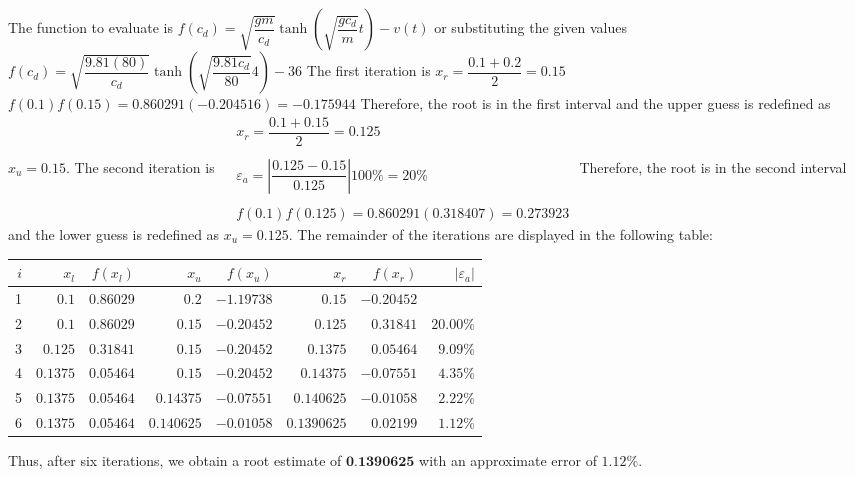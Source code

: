 \documentclass[../main.tex]{subfiles}
\begin{document}
\chapter{}
\label{cha:cha_5}


\section{}
The function to evaluate is
\bigbreak
$f\left(c_{d}\right)=\sqrt{\dfrac{g m}{c_{d}}} \tanh \left(\sqrt{\dfrac{g c_{d}}{m}} t\right)-v(t)$
\bigbreak
or substituting the given values
\bigbreak
$f\left(c_{d}\right)=\sqrt{\dfrac{9.81(80)}{c_{d}}} \tanh \left(\sqrt{\dfrac{9.81 c_{d}}{80}} 4\right)-36$
\bigbreak
The first iteration is
\bigbreak
$x_{r}=\dfrac{0.1+0.2}{2}=0.15$
\bigbreak
$f(0.1) f(0.15)=0.860291(-0.204516)=-0.175944$
\bigbreak
Therefore, the root is in the first interval and the upper guess is redefined as $x_{u}=0.15$. The second iteration is
\bigbreak
$
\begin{aligned}
&x_{r}=\dfrac{0.1+0.15}{2}=0.125 \\\\
&\varepsilon_{a}=\left|\dfrac{0.125-0.15}{0.125}\right| 100 \%=20 \% \\\\
&f(0.1) f(0.125)=0.860291(0.318407)=0.273923
\end{aligned}
$
\bigbreak
Therefore, the root is in the second interval and the lower guess is redefined as $x_{u}=0.125$. 
\smallbreak
The remainder of the iterations are displayed in the following table:
\bigbreak
\begin{tabular}{|r|r|r|r|r|r|r|r|}
\hline
$i$ & $x_{l}$ & $f\left(x_{l}\right)$ & $x_{u}$ & $f\left(x_{u}\right)$ & $x_{r}$ & $f\left(x_{r}\right)$ & $\left|\varepsilon_{a}\right|$ \\
\hline
1 & $0.1$ & $0.86029$ & $0.2$ & $-1.19738$ & $0.15$ & $-0.20452$ &  \\
\hline
2 & $0.1$ & $0.86029$ & $0.15$ & $-0.20452$ & $0.125$ & $0.31841$ & $20.00 \%$ \\
\hline
3 & $0.125$ & $0.31841$ & $0.15$ & $-0.20452$ & $0.1375$ & $0.05464$ & $9.09 \%$ \\
\hline
4 & $0.1375$ & $0.05464$ & $0.15$ & $-0.20452$ & $0.14375$ & $-0.07551$ & $4.35 \%$ \\
\hline
5 & $0.1375$ & $0.05464$ & $0.14375$ & $-0.07551$ & $0.140625$ & $-0.01058$ & $2.22 \%$ \\
\hline
6 & $0.1375$ & $0.05464$ & $0.140625$ & $-0.01058$ & $0.1390625$ & $0.02199$ & $1.12 \%$ \\
\hline
\end{tabular}
\bigbreak
Thus, after six iterations, we obtain a root estimate of $\mathbf{0 . 1 3 9 0 6 2 5}$ with an approximate error of $1.12 \%$.
\bigbreak
\end{document}

